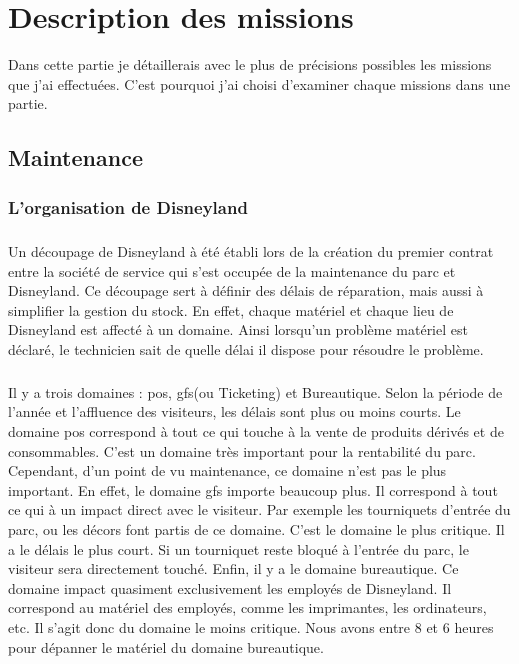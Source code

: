 \chapter{Description des missions}

Dans cette partie je détaillerais avec le plus de précisions possibles les missions que j'ai effectuées. C'est pourquoi j'ai choisi d'examiner chaque missions dans une partie. 

\section{Maintenance}

\subsection{L'organisation de Disneyland}%
\paragraph{}
Un découpage de Disneyland à été établi lors de la création du premier contrat entre la société de service qui s'est occupée de la maintenance du parc et Disneyland.
Ce découpage sert à définir des délais de réparation, mais aussi à simplifier la gestion du stock. En effet, chaque matériel et chaque lieu de Disneyland est affecté à un domaine. Ainsi lorsqu'un problème matériel est déclaré, le technicien sait de quelle délai il dispose pour résoudre le problème.

\paragraph{}
Il y a trois domaines : \gls{pos}, \gls{gfs}(ou \foreignlanguage{english}{Ticketing}) et Bureautique.
Selon la période de l'année et l'affluence des visiteurs, les délais sont plus ou moins courts.
Le domaine \gls{pos} correspond à tout ce qui touche à la vente de produits dérivés et de consommables. C'est un domaine très important pour la rentabilité du parc. Cependant, d'un point de vu maintenance, ce domaine n'est pas le plus important.
En effet, le domaine \gls{gfs} importe beaucoup plus. Il correspond à tout ce qui à un impact direct avec le visiteur. Par exemple les tourniquets d'entrée du parc, ou les décors font partis de ce domaine. C'est le domaine le plus critique. Il a le délais le plus court. Si un tourniquet reste bloqué à l'entrée du parc, le visiteur sera directement touché. 
Enfin, il y a le domaine bureautique. Ce domaine impact quasiment exclusivement les employés de Disneyland. Il correspond au matériel des employés, comme les imprimantes, les ordinateurs, etc. Il s'agit donc du domaine le moins critique. Nous avons entre 8 et 6 heures pour dépanner le matériel du domaine bureautique.

